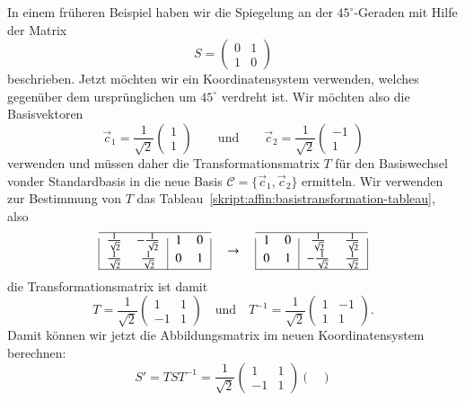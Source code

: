\begin{beispiel}
In einem früheren Beispiel haben wir die Spiegelung an der $45^\circ$-Geraden
mit Hilfe der Matrix 
\[
S=\begin{pmatrix}0&1\\1&0\end{pmatrix}
\]
beschrieben.
Jetzt möchten wir ein Koordinatensystem verwenden, welches gegenüber
dem ursprünglichen um $45^\circ$ verdreht ist.
Wir möchten also die Basisvektoren
\[
\vec{c}_1 = \frac{1}{\sqrt{2}} \begin{pmatrix}1\\1\end{pmatrix}
\qquad\text{und}\qquad
\vec{c}_2 = \frac{1}{\sqrt{2}} \begin{pmatrix}-1\\1\end{pmatrix}
\]
verwenden und müssen daher die Transformationsmatrix $T$ für den
Basiswechsel vonder Standardbasis in die neue Basis
$\mathcal{C}=\{\vec{c}_1,\vec{c}_2\}$ ermitteln.
Wir verwenden zur Bestimmung von $T$ das
Tableau~\eqref{skript:affin:basistransformation-tableau}, also
\[
\begin{tabular}{|>{$}c<{$}>{$}c<{$}|>{$}c<{$}>{$}c<{$}|}
\hline
\frac1{\sqrt{2}}&-\frac1{\sqrt{2}}&1&0\\
\frac1{\sqrt{2}}&\frac1{\sqrt{2}}&0&1\\
\hline
\end{tabular}
\quad
\rightarrow
\quad
\begin{tabular}{|>{$}c<{$}>{$}c<{$}|>{$}c<{$}>{$}c<{$}|}
\hline
1&0&\frac1{\sqrt{2}}&\frac1{\sqrt{2}}\\
0&1&-\frac1{\sqrt{2}}&\frac1{\sqrt{2}}\\
\hline
\end{tabular}
\]
die Transformationsmatrix ist damit
\[
T
=
\frac1{\sqrt{2}}\begin{pmatrix}
1&1\\
-1&1
\end{pmatrix}
\quad\text{und}\quad
T^{-1}
=
\frac1{\sqrt{2}}\begin{pmatrix}
1&-1\\
1&1
\end{pmatrix}.
\]
Damit können wir jetzt die Abbildungsmatrix im neuen Koordinatensystem
berechnen:
\[
S'
=
TST^{-1}
=
\frac1{\sqrt{2}}\begin{pmatrix}
1&1\\
-1&1
\end{pmatrix}
\begin{pmatrix}

\end{pmatrix}\]
\end{beispiel}
